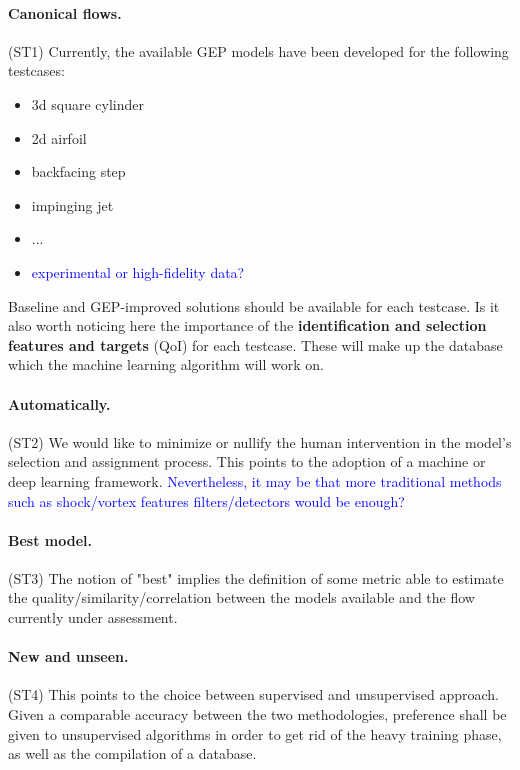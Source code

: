 \paragraph{Canonical flows.} (ST1) Currently, the available GEP models have been developed for the following testcases:
\begin{itemize}
    \item 3d square cylinder
    \item 2d airfoil
    \item backfacing step
    \item impinging jet
    \item ...
    \item \textcolor{blue}{experimental or high-fidelity data?}
\end{itemize}
Baseline and GEP-improved solutions should be available for each testcase. Is it also worth noticing here the importance of the \textbf{identification and selection features and targets} (QoI) for each testcase. These will make up the database which the machine learning algorithm will work on. 

\paragraph{Automatically.} (ST2) We would like to minimize or nullify the human intervention in the model's selection and assignment process. This points to the adoption of a machine or deep learning framework. \textcolor{blue}{Nevertheless, it may be that more traditional methods such as shock/vortex features filters/detectors would be enough?}

\paragraph{Best model.} (ST3) The notion of "best" implies the definition of some metric able to estimate the quality/similarity/correlation between the models available and the flow currently under assessment.

\paragraph{New and unseen.} (ST4) This points to the choice between supervised and unsupervised approach. Given a comparable accuracy between the two methodologies, preference shall be given to unsupervised algorithms in order to get rid of the heavy training phase, as well as the compilation of a database. 

